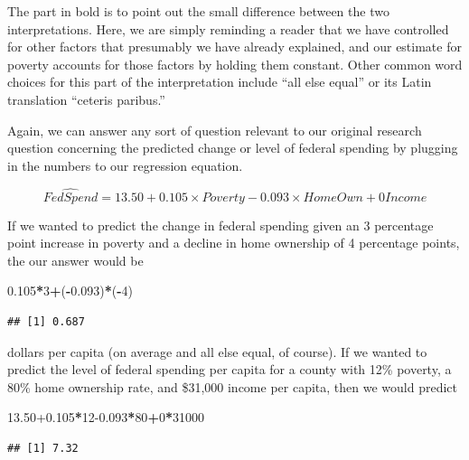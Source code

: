 \documentclass[
]{book}
\newenvironment{Shaded}{\begin{snugshade}}{\end{snugshade}}
\newcommand{\DecValTok}[1]{\textcolor[rgb]{0.00,0.00,0.81}{#1}}
\newcommand{\FloatTok}[1]{\textcolor[rgb]{0.00,0.00,0.81}{#1}}
\newcommand{\NormalTok}[1]{#1}
\newcommand{\OperatorTok}[1]{\textcolor[rgb]{0.81,0.36,0.00}{\textbf{#1}}}
\begin{document}
The part in bold is to point out the small difference between the two interpretations. Here, we are simply reminding a reader that we have controlled for other factors that presumably we have already explained, and our estimate for poverty accounts for those factors by holding them constant. Other common word choices for this part of the interpretation include ``all else equal'' or its Latin translation ``ceteris paribus.''

Again, we can answer any sort of question relevant to our original research question concerning the predicted change or level of federal spending by plugging in the numbers to our regression equation.

\begin{equation}
\hat{FedSpend} = 13.50 + 0.105\times Poverty - 0.093\times HomeOwn + 0Income
\end{equation}

If we wanted to predict the change in federal spending given an 3 percentage point increase in poverty and a decline in home ownership of 4 percentage points, the our answer would be

\begin{Shaded}
\begin{Highlighting}[]
\FloatTok{0.105}\OperatorTok{*}\DecValTok{3}\OperatorTok{+}\NormalTok{(}\OperatorTok{-}\FloatTok{0.093}\NormalTok{)}\OperatorTok{*}\NormalTok{(}\OperatorTok{-}\DecValTok{4}\NormalTok{)}
\end{Highlighting}
\end{Shaded}

\begin{verbatim}
## [1] 0.687
\end{verbatim}

dollars per capita (on average and all else equal, of course). If we wanted to predict the level of federal spending per capita for a county with 12\% poverty, a 80\% home ownership rate, and \$31,000 income per capita, then we would predict

\begin{Shaded}
\begin{Highlighting}[]
\FloatTok{13.50+0.105}\OperatorTok{*}\DecValTok{12}\FloatTok{-0.093}\OperatorTok{*}\DecValTok{80}\OperatorTok{+}\DecValTok{0}\OperatorTok{*}\DecValTok{31000}
\end{Highlighting}
\end{Shaded}

\begin{verbatim}
## [1] 7.32
\end{verbatim}
\end{document}

